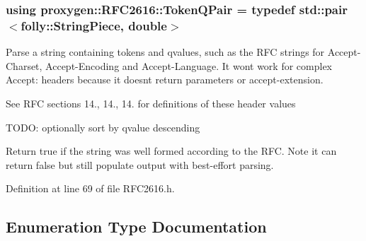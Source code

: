 \subsubsection[{Token\+Q\+Pair}]{\setlength{\rightskip}{0pt plus 5cm}using {\bf proxygen\+::\+R\+F\+C2616\+::\+Token\+Q\+Pair} = typedef std\+::pair$<$folly\+::\+String\+Piece, double$>$}\label{namespaceproxygen_1_1RFC2616_ab879755d2a94c65fdf500196944b3364}
Parse a string containing tokens and qvalues, such as the R\+FC strings for Accept-\/\+Charset, Accept-\/\+Encoding and Accept-\/\+Language. It won\textquotesingle{}t work for complex Accept\+: headers because it doesn\textquotesingle{}t return parameters or accept-\/extension.

See R\+FC sections 14., 14., 14. for definitions of these header values

T\+O\+DO\+: optionally sort by qvalue descending

Return true if the string was well formed according to the R\+FC. Note it can return false but still populate output with best-\/effort parsing. 

Definition at line 69 of file R\+F\+C2616.\+h.



\subsection{Enumeration Type Documentation}
